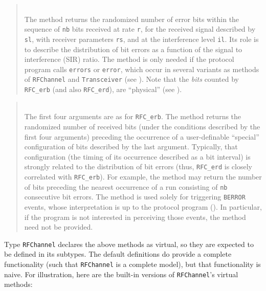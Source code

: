 \begin{quote}
\noindent{} \hspace{0in}\vspace{0.05in}\\
\noindent
The method returns the randomized number of error bits within the sequence of
{\tt nb} bits received at rate {\tt r}, for the received signal described by
{\tt sl}, with receiver parameters {\tt rs}, and at the interference
level {\tt il}.
Its role is to describe the distribution of bit errors as a function of the
signal to interference (SIR) ratio.
The method is only needed if the protocol program calls
{\tt errors} or {\tt error}, which occur in several variants as methods of
{\tt RFChannel} and {\tt Transceiver} (see ).
Note that the {\em bits\/} counted by {\tt RFC\_erb} (and also {\tt RFC\_erd}),
are ``physical'' (see ).
\end{quote}

\begin{quote}
\noindent{} \hspace{0in}\vspace{0.05in}\\
\noindent
The first four arguments are as for {\tt RFC\_erb}.
The method returns the randomized number of received
bits (under the conditions described by the first four arguments)
preceding the occurrence of a user-definable ``special''
configuration of bits described by the last argument.
Typically, that configuration
(the timing of its occurrence described as a bit interval)
is strongly related to the distribution of
bit errors (thus, {\tt RFC\_erd} is closely correlated with {\tt RFC\_erb}).
For example, the method may
return the number of bits preceding the nearest occurrence of a run consisting
of {\tt nb} consecutive bit errors.
The method is used solely
for triggering {\tt BERROR} events, whose interpretation
is up to the protocol program ().
In particular, if the program is not interested in perceiving those events,
the method need not be provided.
\end{quote}

Type {\tt RFChannel} declares the above methods as virtual, so they are
expected to be defined in its subtypes.
The default definitions do provide a complete functionality (such that
{\tt RFChannel} is a complete model), but that functionality is naive.
For illustration, here are the built-in versions of {\tt RFChannel}'s
virtual methods:

